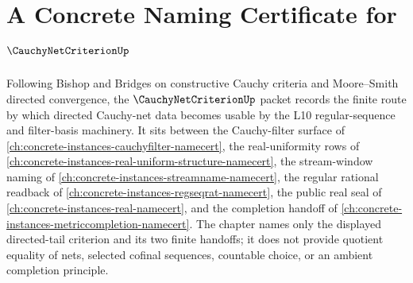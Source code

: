 \chapter{A Concrete Naming Certificate for $\CauchyNetCriterionUp$}
\label{ch:concrete-instances-cauchy-net-criterion-namecert}

Following Bishop and Bridges on constructive Cauchy criteria and Moore--Smith directed convergence, the $\CauchyNetCriterionUp$ packet records the finite route by which directed Cauchy-net data becomes usable by the L10 regular-sequence and filter-basis machinery. It sits between the Cauchy-filter surface of \autoref{ch:concrete-instances-cauchyfilter-namecert}, the real-uniformity rows of \autoref{ch:concrete-instances-real-uniform-structure-namecert}, the stream-window naming of \autoref{ch:concrete-instances-streamname-namecert}, the regular rational readback of \autoref{ch:concrete-instances-regseqrat-namecert}, the public real seal of \autoref{ch:concrete-instances-real-namecert}, and the completion handoff of \autoref{ch:concrete-instances-metriccompletion-namecert}. The chapter names only the displayed directed-tail criterion and its two finite handoffs; it does not provide quotient equality of nets, selected cofinal sequences, countable choice, or an ambient completion principle.

